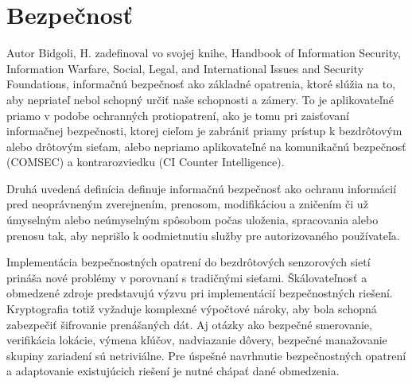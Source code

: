 \documentclass[12pt,a4wide,oneside,openright]{report}
\begin{document}
%

\section{Bezpečnosť}  \label{s_security}
Autor Bidgoli, H. zadefinoval vo svojej knihe, Handbook of Information Security, Information Warfare, Social, Legal, and International Issues and Security Foundations\cite{bidgoli2006handbook}, informačnú bezpečnosť ako základné opatrenia, ktoré slúžia na to, aby nepriateľ nebol schopný určiť naše schopnosti a zámery. To je aplikovateľné priamo v podobe ochranných protiopatrení, ako je tomu pri zaisťovaní informačnej bezpečnosti, ktorej cieľom je zabrániť priamy prístup k bezdrôtovým alebo drôtovým sieťam, alebo nepriamo aplikovateľné na komunikačnú bezpečnosť (COMSEC) a kontrarozviedku (CI Counter Intelligence).

Druhá uvedená definícia definuje informačnú bezpečnosť ako ochranu informácií pred neoprávneným zverejnením, prenosom, modifikáciou a zničením či už úmyselným alebo neúmyselným spôsobom počas uloženia, spracovania alebo prenosu tak, aby neprišlo k oodmietnutiu služby pre autorizovaného používateľa.\cite{bidgoli2006handbook}

Implementácia bezpečnostných opatrení do bezdrôtových senzorových sietí prináša nové problémy v porovnaní s tradičnými sieťami. Škálovateľnosť a obmedzené zdroje predstavujú výzvu pri implementácií bezpečnostných riešení. Kryptografia totiž vyžaduje komplexné výpočtové nároky, aby bola schopná zabezpečiť šifrovanie prenášaných dát. Aj otázky ako bezpečné smerovanie, verifikácia lokácie, výmena kľúčov, nadviazanie dôvery, bezpečné manažovanie skupiny zariadení sú netriviálne.
Pre úspešné navrhnutie bezpečnostných opatrení a adaptovanie existujúcich riešení je nutné chápať dané obmedzenia\cite{bidgoli2006handbook}.
\end{document}
